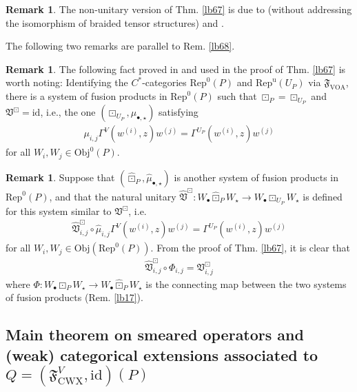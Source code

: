\documentclass[11pt,b5paper,notitlepage]{article}
\theoremstyle{definition}
\newtheorem{rem}[df]{Remark}
\theoremstyle{plain}
\newcommand{\fk}{\mathfrak}
\newcommand{\wht}{\widehat}
\newcommand{\id}{\mathrm{id}}
\newcommand{\Rep}{\mathrm{Rep}}
\newcommand{\blt}{\bullet}
\newcommand{\Obj}{\mathrm{Obj}}
\newcommand{\CWX}{{\scriptscriptstyle \mathrm{CWX}}}
\newcommand{\VOA}{{\scriptscriptstyle \mathrm{VOA}}}
\newcommand{\RepUP}{\mathrm{Rep}^{\mathrm u}(U_P)}
\numberwithin{equation}{section}
\begin{document}
\begin{rem}
The non-unitary version of Thm. \ref{lb67} is due to \cite{HKL15} (without addressing the isomorphism of braided tensor structures) and \cite{CKM24}.
\end{rem}

The following two remarks are  parallel to Rem. \ref{lb68}.

\begin{rem}\label{lb73}
The following fact proved in \cite[Thm. 3.29]{Gui22} and used in the proof of Thm. \ref{lb67} is worth noting: Identifying the $C^*$-categories $\Rep^0(P)$ and $\RepUP$ via $\fk F_\VOA$, there is a system of fusion products in $\Rep^0(P)$ such that $\boxdot_P=\boxdot_{U_P}$ and $\fk V^\boxdot=\id$, i.e., the one $(\boxdot_{U_P},\mu_{\blt,\star})$ satisfying
\begin{align}\label{eq60}
\mu_{i,j}\Gamma^V(w^{(i)},z)w^{(j)}=\Gamma^{U_P}(w^{(i)},z)w^{(j)}
\end{align}
for all $W_i,W_j\in\Obj^0(P)$.
\end{rem}



\begin{rem}
Suppose that $(\wht\boxdot_P,\wht\mu_{\blt,\star})$ is another system of fusion products in $\Rep^0(P)$, and that the natural unitary $\wht{\fk V}^\boxdot:W_\blt\wht\boxdot_P W_\star\rightarrow W_\blt\boxdot_{U_P}W_\star$ is defined for this system similar to $\fk V^\boxdot$, i.e.
\begin{align*}
\wht{\fk V}^\boxdot_{i,j}\circ\wht\mu_{i,j}\Gamma^V(w^{(i)},z) w^{(j)}=\Gamma^{U_P}(w^{(i)},z)w^{(j)}
\end{align*}
for all $W_i,W_j\in\Obj(\Rep^0(P))$. From the proof of Thm. \ref{lb67}, it is clear that
\begin{align}\label{eq65}
\wht{\fk V}_{i,j}^\boxdot\circ\Phi_{i,j}=\fk V_{i,j}^\boxdot
\end{align}
where $\Phi:W_\blt\boxdot_P W_\star\rightarrow W_\blt\wht\boxdot_P W_\star$ is the connecting map between the two systems of fusion products (Rem. \ref{lb17}). 
\end{rem}



\subsection{Main theorem on smeared operators and (weak) categorical extensions associated to $Q=(\fk F^V_\CWX,\id)(P)$}
\end{document}
